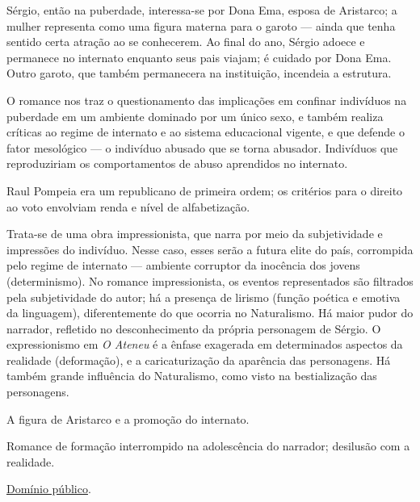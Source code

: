 Sérgio, então na puberdade, interessa-se por Dona Ema, esposa de Aristarco; a mulher representa como uma figura materna para o garoto — ainda que tenha sentido certa atração ao se conhecerem. Ao final do ano, Sérgio adoece e permanece no internato enquanto seus pais viajam; é cuidado por Dona Ema. Outro garoto, que também permanecera na instituição, incendeia a estrutura.

O romance nos traz o questionamento das implicações em confinar indivíduos na puberdade em um ambiente dominado por um único sexo, e também realiza críticas ao regime de internato e ao sistema educacional vigente, e que defende o fator mesológico — o indivíduo abusado que se torna abusador. Indivíduos que reproduziriam os comportamentos de abuso aprendidos no internato.

Raul Pompeia era um republicano de primeira ordem; os critérios para o direito ao voto envolviam renda e nível de alfabetização.

Trata-se de uma obra impressionista, que narra por meio da subjetividade e impressões do indivíduo. Nesse caso, esses serão a futura elite do país, corrompida pelo regime de internato — ambiente corruptor da inocência dos jovens (determinismo). No romance impressionista, os eventos representados são filtrados pela subjetividade do autor; há a presença de lirismo (função poética e emotiva da linguagem), diferentemente do que ocorria no Naturalismo. Há maior pudor do narrador, refletido no desconhecimento da própria personagem de Sérgio. O expressionismo em \textit{O Ateneu} é a ênfase exagerada em determinados aspectos da realidade (deformação), e a caricaturização da aparência das personagens. Há também grande influência do Naturalismo, como visto na bestialização das personagens.

A figura de Aristarco e a promoção do internato. 

Romance de formação interrompido na adolescência do narrador; desilusão com a realidade.

\href{http://www.dominiopublico.gov.br/download/texto/bv000297.pdf}{Domínio público}.